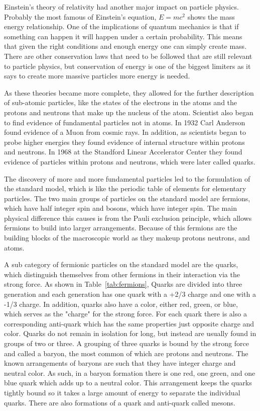 Einstein's theory of relativity had another major impact on particle physics. Probably the most famous of Einstein's equation, $E = mc^2$ shows the mass energy relationship. One of the implications of quantum mechanics is that if something can happen it will happen under a certain probability. This means that given the right conditions and enough energy one can simply create mass. There are other conservation laws that need to be followed that are still relevant to particle physics, but conservation of energy is one of the biggest limiters as it says to create more massive particles more energy is needed. 

As these theories became more complete, they allowed for the further description of sub-atomic particles, like the states of the electrons in the atoms and the protons and neutrons that make up the nucleus of the atom. Scientist also began to find evidence of fundamental particles not in atoms. In 1932 Carl Anderson found evidence of a Muon from cosmic rays. In addition, as scientists began to probe higher energies they found evidence of internal structure within protons and neutrons. In 1968 at the Standford Linear Accelerator Center they found evidence of particles within protons and neutrons, which were later called quarks.

The discovery of more and more fundamental particles led to the formulation of the standard model, which is like the periodic table of elements for elementary particles. The two main groups of particles on the standard model are fermions, which have half integer spin and bosons, which have integer spin. The main physical difference this causes is from the Pauli exclusion principle, which allows fermions to build into larger arrangements. Because of this fermions are the building blocks of the macroscopic world as they makeup protons neutrons, and atoms.   

A sub category of fermionic particles on the standard model are the quarks, which distinguish themselves from other fermions in their interaction via the strong force. As shown in Table~\ref{tab:fermions}, Quarks are divided into three generation and each generation has one quark with a +2/3 charge and one with a -1/3 charge. In addition, quarks also have a color, either red, green, or blue, which serves as the "charge" for the strong force. For each quark there is also a corresponding anti-quark which has the same properties just opposite charge and color. Quarks do not remain in isolation for long, but instead are usually found in groups of two or three. A grouping of three quarks is bound by the strong force and called a baryon, the most common of which are protons and neutrons. The known arrangements of baryons are such that they have integer charge and neutral color. As such, in a baryon formation there is one red, one green, and one blue quark which adds up to a neutral color. This arrangement keeps the quarks tightly bound so it takes a large amount of energy to separate the individual quarks. There are also formations of a quark and anti-quark called mesons.  

